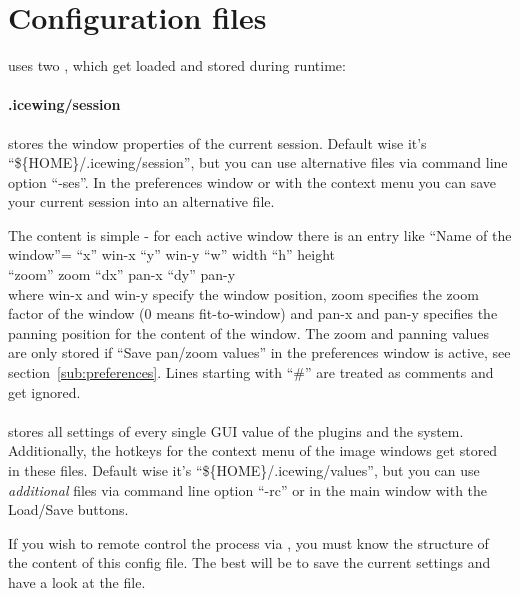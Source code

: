 \section{Configuration files}

\icewing{} uses two , which get loaded
and stored during runtime:

\paragraph {.icewing/session}
stores the window properties of the current session.
Default wise it's ``\$\{HOME\}/.icewing/session'', but you can use
alternative files via command line option ``-ses''.
In the preferences window or with the context menu 
you can save your current session into an alternative file.

The content is simple - for each active window there is an entry like
\sS
\hspace*{4ex}``Name of the window''= ``x'' win-x ``y'' win-y ``w'' width ``h'' height\\
\hspace*{29ex}``zoom'' zoom ``dx'' pan-x ``dy'' pan-y\\
\sE
where win-x and win-y specify the window position, zoom specifies
the zoom factor of the window (0 means fit-to-window) and pan-x and
pan-y specifies the panning position for the content of the
window. The zoom and panning values are only stored if ``Save
pan/zoom values'' in the preferences window is active, see
section~\ref{sub:preferences}. Lines starting with ``\#'' are
treated as comments and get ignored.

\paragraph{\label{para:icewingValue}}
stores all settings of every single GUI value of the plugins and
the \icewing{} system. Additionally, the hotkeys for the context
menu of the image windows get stored in these files. Default wise
it's ``\$\{HOME\}/.icewing/values'', but you can use {\em additional}
files via command line option ``-rc'' or in the main window with the
Load/Save buttons.

If you wish to remote control the \icewing{} process via \dacs{}, you
must know the structure of the content of this config file.
The best will be to save the current settings and have a look at the file.

